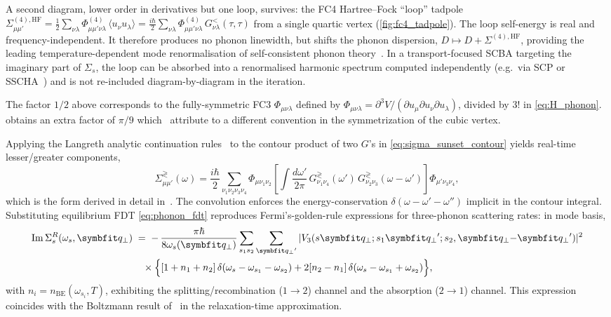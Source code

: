 A second diagram, lower order in derivatives but one loop, survives:
the FC4 Hartree--Fock ``loop'' tadpole
$\Sigma^{(4),\mathrm{HF}}_{\mu\mu'} = \tfrac{1}{2}
\sum_{\nu\lambda} \Phi^{(4)}_{\mu\mu'\nu\lambda}\,\langle u_\nu u_\lambda\rangle
= \tfrac{i\hbar}{2}
\sum_{\nu\lambda} \Phi^{(4)}_{\mu\mu'\nu\lambda}\,
G^{<}_{\nu\lambda}(\tau,\tau)$ from a single quartic vertex (\cref{fig:fc4_tadpole}).
The loop self-energy is real and frequency-independent.
It therefore produces no phonon linewidth, but shifts the phonon
dispersion, $D \mapsto D + \Sigma^{(4),\mathrm{HF}}$, providing the
leading temperature-dependent mode renormalisation of self-consistent
phonon theory~\cite{tadano_first-principles_2018,wang_nonequilibrium_2014}. In a
transport-focused SCBA targeting the imaginary part of $\Sigma_s$, the
loop can be absorbed into a renormalised harmonic spectrum
computed independently (e.g.\ via SCP or
SSCHA~\cite{paulatto_first-principles_2015,tadano_first-principles_2018}) and is not
re-included diagram-by-diagram in the iteration.

The factor $1/2$ above corresponds to the fully-symmetric FC3
$\Phi_{\mu\nu\lambda}$ defined by
$\Phi_{\mu\nu\lambda} = \partial^3 V/(\partial u_\mu \partial u_\nu \partial u_\lambda)$,
divided by $3!$ in \cref{eq:H_phonon}.  obtains an extra factor of $\pi/9$
which~\citet{guo_quantum_2020} attribute to a different convention in
the symmetrization of the cubic vertex.

Applying the Langreth analytic continuation rules~\cite{devreese_linear_1976,haug_quantum_2008}
to the contour product of two $G$'s in
\cref{eq:sigma_sunset_contour} yields real-time lesser/greater
components,
\begin{equation}\label{eq:sigma_guo}
  \Sigma^{\gtrless}_{\mu\mu'}(\omega)
  = \frac{i\hbar}{2}
    \sum_{\nu_1\nu_2\nu_3\nu_4}
    \Phi_{\mu\nu_1\nu_2}
    \left[
      \int\frac{d\omega'}{2\pi}\,
      G^{\gtrless}_{\nu_1\nu_4}(\omega')\,
      G^{\gtrless}_{\nu_2\nu_3}(\omega-\omega')
    \right]
    \Phi_{\mu'\nu_3\nu_4},
\end{equation}
which is the form derived in detail in~\cite{wang_nonequilibrium_2014,guo_quantum_2020}.
The convolution enforces the
energy-conservation $\delta(\omega - \omega' - \omega'')$ implicit in
the contour integral. Substituting equilibrium FDT
\cref{eq:phonon_fdt} reproduces Fermi's-golden-rule expressions for
three-phonon scattering rates: in mode basis,
\begin{align}\label{eq:fgr}
  \mathrm{Im}\,\Sigma^R_s(\omega_s,\qp)
  &\;=\;
   -\,\frac{\pi\hbar}{8 \omega_s(\qp)}
   \sum_{s_1 s_2}\sum_{\qp{}'}
   |V_3(s\qp; s_1\qp{}'; s_2,\qp{-}\qp{}')|^2 \notag\\
  &\quad\times
   \Bigl\{
     [1 + n_1 + n_2]\,\delta(\omega_s - \omega_{s_1} - \omega_{s_2})
     + 2[n_2 - n_1]\,\delta(\omega_s - \omega_{s_1} + \omega_{s_2})
   \Bigr\},
\end{align}
with $n_i = n_{\mathrm{BE}}(\omega_{s_i},T)$, exhibiting the
splitting/recombination ($1\to 2$) channel and the absorption ($2\to 1$)
channel. This expression coincides with the Boltzmann result of~\citet{klemens_anharmonic_1966}
in the relaxation-time approximation.

